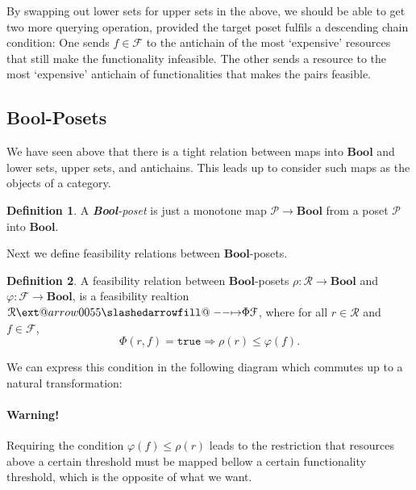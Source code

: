 \documentclass[12pt]{article}
\makeatletter
\theoremstyle{definition}
\newtheorem{definition}{Definition}[section]
\theoremstyle{plain}
\theoremstyle{plain}
\theoremstyle{plain}
\theoremstyle{plain}
\theoremstyle{remark}
\theoremstyle{remark}
\newcommand{\mc}[1]{\mathcal{#1}}
\def\slashedarrowfill@#1#2#3#4#5{%
	$\m@th\thickmuskip0mu\medmuskip\thickmuskip\thinmuskip\thickmuskip
	\relax#5#1\mkern-7mu%
	\cleaders\hbox{$#5\mkern-2mu#2\mkern-2mu$}\hfill
	\mathclap{#3}\mathclap{#2}%
	\cleaders\hbox{$#5\mkern-2mu#2\mkern-2mu$}\hfill
	\mkern-7mu#4$%
}
\def\rightslashedarrowfill@{%
	\slashedarrowfill@\relbar\relbar\mapstochar\rightarrow}
\newcommand\xslashedrightarrow[2][]{%
	\ext@arrow 0055{\rightslashedarrowfill@}{#1}{#2}}
\makeatother
\begin{document}
By swapping out lower sets for upper sets in the above, we should be able to get two more querying operation, provided the target poset fulfils a descending chain condition: One sends $f \in \mc{F}$ to the antichain of the most `expensive' resources that still make the functionality infeasible. The other sends a resource to the most `expensive' antichain of functionalities that makes the pairs feasible.

\subsection{Bool-Posets} \label{bool-pos}
We have seen above that there is a tight relation between maps into $\mathbf{Bool}$ and lower sets, upper sets, and antichains. This leads up to consider such maps as the objects of a category. 

\begin{definition} 
	A \emph{\textbf{Bool}-poset} is just a monotone map $\mc{P} \rightarrow \mathbf{Bool}$ from a poset $\mc{P}$ into $\mathbf{Bool}$. 
\end{definition}

Next we define feasibility relations between $\mathbf{Bool}$-posets.

\begin{definition} \label{def bool-pos morphism}
	A feasibility relation between $\mathbf{Bool}$-posets $\rho: \mc{R} \rightarrow \mathbf{Bool}$ and $\varphi: \mc{F} \rightarrow \mathbf{Bool}$, is a feasibility realtion $\mc{R} \xslashedrightarrow{\Phi} \mc{F}$, where for all $r \in \mc{R}$ and $f \in \mc{F}$,
	$$\Phi(r,f) = \mathtt{true} \Rightarrow \rho(r) \leq \varphi(f).$$
\end{definition}

We can express this condition in the following diagram which commutes up to a natural transformation:

\begin{center}
\end{center}

\paragraph{Warning!} Requiring the condition $\varphi(f) \leq \rho(r)$ leads to the restriction that resources above a certain threshold must be mapped bellow a certain functionality threshold, which is the opposite of what we want.
\end{document}
